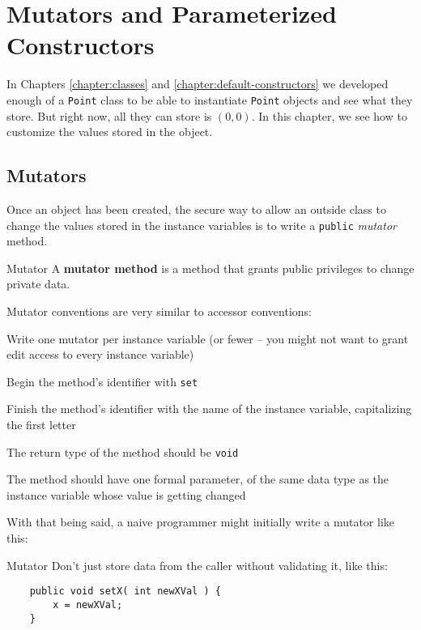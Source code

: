 
\chapter{Mutators and Parameterized Constructors}
\label{chapter:mutators}

\minitoc

In Chapters \ref{chapter:classes} and \ref{chapter:default-constructors} we developed enough of a \texttt{Point} class to be able to instantiate \texttt{Point} objects and see what they store.  But right now, all they can store is $(0,0)$.  In this chapter, we see how to customize the values stored in the object.

\section{Mutators}

Once an object has been created, the secure way to allow an outside class to change the values stored in the instance variables is to write a \texttt{public} \textit{mutator} method.

\begin{defn}{Mutator}
    A \textbf{mutator method} is a method that grants public privileges to change private data.
\end{defn}

Mutator conventions are very similar to accessor conventions:

\bi
\item Write one mutator per instance variable (or fewer -- you might not want to grant edit access to every instance variable)
\item Begin the method's identifier with \texttt{set}
\item Finish the method's identifier with the name of the instance variable, capitalizing the first letter
\item The return type of the method should be \texttt{void}
\item The method should have one formal parameter, of the same data type as the instance variable whose value is getting changed
\ei

With that being said, a naive programmer might initially write a mutator like this:

\begin{trap}{Mutator}
    Don't just store data from the caller without validating it, like this:
    \begin{verbatim}
    public void setX( int newXVal ) {
        x = newXVal;
    }
    \end{verbatim}
\end{trap}

